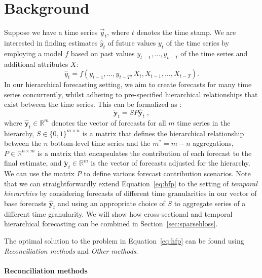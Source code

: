 \documentclass[preprint, 3p, times, twocolumn]{elsarticle}
\begin{document}
\section{Background} \label{sec:background}
Suppose we have a time series \(\vec{y}_t\), where \(t\) denotes the time stamp. We are interested in finding estimates \(\hat{y}_{t}\) of future values \({y}_{t}\) of the time series by employing a model \(f\) based on past values \(y_{t-1}, \dots, y_{t-T}\) of the time series and additional attributes \(X\):
\begin{equation}
  \hat{y}_{t} = f(y_{t-1}, \dots, y_{t-T}, X_{t}, X_{t-1}, \dots, X_{t-T}).
\end{equation}
In our hierarchical forecasting setting, we aim to create forecasts for many time series concurrently, whilst adhering to pre-specified hierarchical relationships that exist between the time series. This can be formalized as \cite{hyndman_forecasting_2021}:
\begin{equation} \label{eq:hfp}
  \tilde{\textbf{y}}_{t} = SP\hat{\textbf{y}}_{t} \;,
\end{equation}
where \(\hat{\textbf{y}}_{t} \in \mathbb{R}^{m} \) denotes the vector of forecasts for all \(m\) time series in the hierarchy, \(S \in \{0, 1\}^{m \times n}\) is a matrix that defines the hierarchical relationship between the \(n\) bottom-level time series and the \(m^* = m - n\) aggregations, \(P \in \mathbb{R}^{n \times m}\) is a matrix that encapsulates the contribution of each forecast to the final estimate, and \(\tilde{\textbf{y}}_{t} \in \mathbb{R}^{m} \) is the vector of forecasts adjusted for the hierarchy. We can use the matrix \(P\) to define various forecast contribution scenarios. Note that we can straightforwardly extend Equation~\eqref{eq:hfp} to the setting of \textit{temporal hierarchies} \cite{athanasopoulos_forecasting_2017,rangapuram_coherent_2023} by considering forecasts of different time granularities in our vector of base forecasts \(\hat{\textbf{y}}_{t}\) and using an appropriate choice of \(S\) to aggregate series of a different time granularity. We will show how cross-sectional and temporal hierarchical forecasting can be combined in Section~\ref{sec:sparsehloss}.

The optimal solution to the problem in Equation~\eqref{eq:hfp} can be found using \textit{Reconciliation methods} and \textit{Other methods}.

\paragraph{Reconciliation methods}
\end{document}
